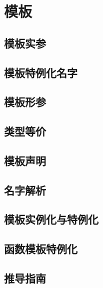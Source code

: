 
\chapter{模板}

\section{模板实参}
\section{模板特例化名字}
\section{模板形参}
\section{类型等价}
\section{模板声明}
\section{名字解析}
\section{模板实例化与特例化}
\section{函数模板特例化}
\section{推导指南}
